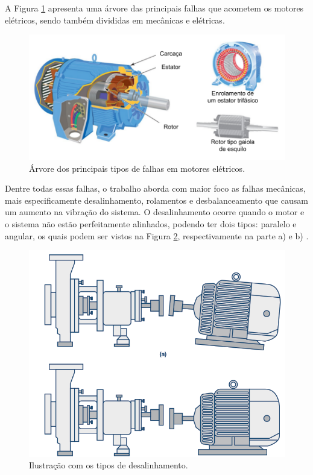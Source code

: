 A Figura \ref{fig:faults_rilski_p77} apresenta uma árvore das principais falhas que acometem os motores elétricos, sendo também divididas
em mecânicas e elétricas. 

\begin{figure}[H]
    \caption{Árvore dos principais tipos de falhas em motores elétricos.}
    \begin{center}
        \includegraphics[scale=1, page=3]{referencial/img/imagens_referencial.pdf}
    \end{center}
    \label{fig:faults_rilski_p77}
\end{figure}

Dentre todas essas falhas, o trabalho aborda com maior foco as falhas mecânicas, mais especificamente desalinhamento, rolamentos 
e desbalanceamento que causam um aumento na vibração do sistema. O desalinhamento ocorre quando o motor e o sistema não estão perfeitamente alinhados, podendo ter dois tipos:
paralelo e angular, os quais podem ser vistos na Figura \ref{fig:misadraw_analog_p2}, respectivamente na parte a) e b) 
\cite{Sopcik2019}.

\begin{figure}[H]
    \caption{Ilustração com os tipos de desalinhamento.}
    \begin{center}
        \includegraphics[scale=.35]{referencial/img/misadraw_analog_p2.png}
    \end{center}
    \label{fig:misadraw_analog_p2}
\end{figure}

